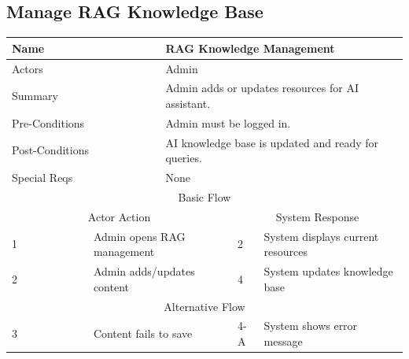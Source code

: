 \documentclass{FastFyp}
\begin{document}
\subsection{Manage RAG Knowledge Base}
\noindent
\begin{minipage}{\textwidth}
\centering
{}
\label{tab:ragmanagement}
\begin{tabular}{|p{}|p{}|p{}|p{}|p{}|}
\hline
\multicolumn{2}{|p{0.15\textwidth}|}{Name} &
  \multicolumn{3}{p{0.75\textwidth}|}{RAG Knowledge Management} \\ \hline
\multicolumn{2}{|p{0.15\textwidth}|}{Actors} &
  \multicolumn{3}{p{0.75\textwidth}|}{Admin} \\ \hline
\multicolumn{2}{|p{0.15\textwidth}|}{Summary} &
  \multicolumn{3}{p{0.75\textwidth}|}{Admin adds or updates resources for AI assistant.} \\ \hline
\multicolumn{2}{|p{0.15\textwidth}|}{Pre-Conditions} &
  \multicolumn{3}{p{0.75\textwidth}|}{Admin must be logged in.} \\ \hline
\multicolumn{2}{|p{0.15\textwidth}|}{Post-Conditions} &
  \multicolumn{3}{p{0.75\textwidth}|}{AI knowledge base is updated and ready for queries.} \\ \hline
\multicolumn{2}{|p{0.15\textwidth}|}{Special Reqs} &
  \multicolumn{3}{p{0.75\textwidth}|}{None} \\ \hline
\multicolumn{5}{|c|}{Basic Flow} \\ \hline
\multicolumn{3}{|c|}{Actor Action} &
  \multicolumn{2}{c|}{System Response} \\ \hline
1 &
  \multicolumn{2}{p{0.42\textwidth}|}{Admin opens RAG management} &
  2 &
  System displays current resources \\ \hline
2 &
  \multicolumn{2}{p{0.42\textwidth}|}{Admin adds/updates content} &
  4 &
  System updates knowledge base \\ \hline
\multicolumn{5}{|c|}{Alternative Flow} \\ \hline
3 &
  \multicolumn{2}{p{0.42\textwidth}|}{Content fails to save} &
  4-A &
  System shows error message \\ \hline
\end{tabular}
\end{minipage}

\vspace{1em}

\end{document}
